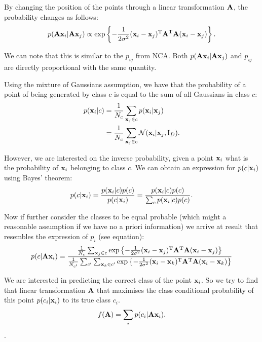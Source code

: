 	By changing the position of the points through a linear transformation $\mathbf{A}$,
	the probability changes as follows:
	\begin{align}
	    p(\mathbf{A}\mathbf{x}_i|\mathbf{A}\mathbf{x}_j) \propto \exp \left\{-\frac{1}{2\sigma^2} (\mathbf{x}_i -
	\mathbf{x}_j)^\mathrm{T}\mathbf{A}^\mathrm{T}\mathbf{A}(\mathbf{x}_i - \mathbf{x}_j)\right\}.
	\end{align}
	
	We can note that this is similar to the $p_{ij}$ from NCA. Both
	$p(\mathbf{A}\mathbf{x}_i|\mathbf{A}\mathbf{x}_j)$ and $p_{ij}$ are directly proportional with the same
	quantity.
	
	Using the mixture of Gaussians assumption, we have that the probability of a
	point of being generated by class $c$ is equal to the sum of all Gaussians in
	class $c$:
	\begin{align}
	    p(\mathbf{x}_i|c) &= \frac{1}{N_c}\sum_{\mathbf{x}_j \in c} p(\mathbf{x}_i|\mathbf{x}_j)\\
	               &= \frac{1}{N_c}\sum_{\mathbf{x}_j \in c} \mathcal{N}(\mathbf{x}_i|\mathbf{x}_j,
	\mathrm{I}_D).
	\end{align}
	
	However, we are interested on the inverse probability, given a point $\mathbf{x}_i$
	what is the probability of $\mathbf{x}_i$ belonging to class $c$. We can obtain an
	expression for $p(c|\mathbf{x}_i)$ using Bayes' theorem:
	\begin{align}
	    p(c|\mathbf{x}_i) = \frac{p(\mathbf{x}_i|c)p(c)}{p(c|\mathbf{x}_i)} =
	\frac{p(\mathbf{x}_i|c)p(c)}{\sum_{c} p(\mathbf{x}_i|c)p(c)}.
	    \label{eq:nca-cc-kde-bayes}
	\end{align}
	
	Now if further consider the classes to be equal probable (which might a
	reasonable assumption if we have no a priori information) we arrive at result
	that resembles the expression of $p_i$ (see equation):
	\begin{align}
	    p(c|\mathbf{A}\mathbf{x}_i) = \frac{
	                \frac{1}{N_c}\sum_{\mathbf{x}_j \in
	c}\exp\left\{-\frac{1}{2\sigma^2}(\mathbf{x}_i -
	\mathbf{x}_j)^\mathrm{T}\mathbf{A}^\mathrm{T}\mathbf{A}(\mathbf{x}_i - \mathbf{x}_j)\right\}
	                }
	                {
	                \frac{1}{N_{c'}}\sum_{c'} \sum_{\mathbf{x}_k \in
	c'}\exp\left\{-\frac{1}{2\sigma^2}(\mathbf{x}_i -
	\mathbf{x}_k)^\mathrm{T}\mathbf{A}^\mathrm{T}\mathbf{A}(\mathbf{x}_i - \mathbf{x}_k)\right\}
	                }
	\end{align}
	
	We are interested in predicting the correct class of the point $\mathbf{x}_i$. So we
	try to find that linear transformation $\mathbf{A}$ that maximises the class
	conditional probability of this point $p(c_i|\mathbf{x}_i)$ to its true class $c_i$.
	\begin{align}
	    f(\mathbf{A}) = \sum_i p(c_i|\mathbf{A}\mathbf{x}_i).
	    \label{eq:nca-cc-kde-obj}
	\end{align}.
	
